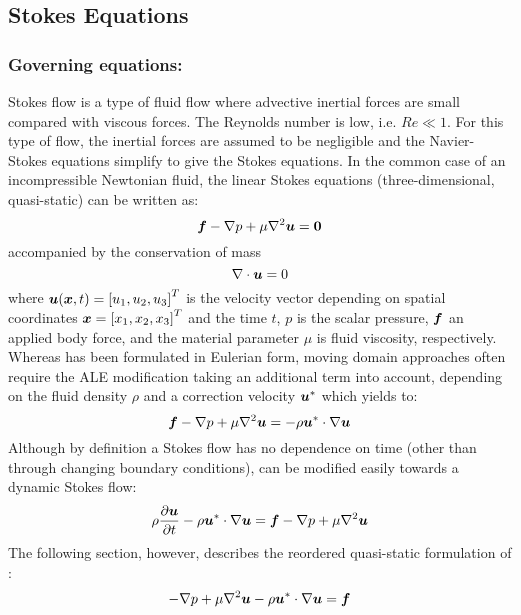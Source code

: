 \subsection{Stokes Equations}

\subsubsection{Governing equations:}

Stokes flow is a type of fluid flow where advective inertial forces are small
compared with viscous forces. The Reynolds number is low, i.e.
$\textit{Re}\ll 1$. For this type of flow, the inertial forces are assumed to
be negligible and the Navier-Stokes equations simplify to give the Stokes
equations. In the common case of an incompressible Newtonian fluid, the linear
Stokes equations (three-dimensional, quasi-static) can be written as:
\begin{equation}
    \vectr{f}-\gradient{}{p}+\mu\laplacian{}{\vectr{u}}=\vectr{0}
  \label{eqn:Stokesequation1}
\end{equation}
accompanied by the conservation of mass
\begin{equation}
  \divergence{}{\vectr{u}}=0
  \label{eqn:Stokesmasequation}
\end{equation}
where $\boldsymbol{u}(\boldsymbol{x},t)={\left[ u_1,u_2,u_3 \right]}^{T}$ is the
velocity vector depending on spatial coordinates $\boldsymbol{x}={\left[ x_1,x_2,x_3 \right]}^{T}$
and the time $t$, $p$ is the scalar pressure, $\boldsymbol{f}$ an applied body
force, and the material parameter $\mu$ is fluid viscosity,
respectively. Whereas  has been formulated in
Eulerian form, moving domain approaches often require the ALE modification
taking an additional term into account, depending on the fluid density $\rho$
and a correction velocity $\boldsymbol{u}^*$ which yields to:
\begin{equation}
  \vectr{f}-\gradient{}{p}+\mu\laplacian{}{\vectr{u}}=-\rho\dotprod{\vectr{u}^*}{\gradient{}{\vectr{u}}}
  \label{eqn:StokesequationALE}
\end{equation}
Although by definition a Stokes flow has no dependence on time (other than
through changing boundary conditions),  can be
modified easily towards a dynamic Stokes flow:
\begin{equation}
    \rho\delby{\vectr{u}}{t}-\rho\dotprod{\vectr{u}^*}{\gradient{}{\vectr{u}}}=\vectr{f}-\gradient{}{p}+\mu\laplacian{}{\vectr{u}}
  \label{eqn:Stokesequation2}
\end{equation}
The following section, however, describes the reordered quasi-static
formulation of :
\begin{equation}
    -\gradient{}{p}+\mu\laplacian{}{\vectr{u}}-\rho\dotprod{\vectr{u}^*}{\gradient{}{\vectr{u}}}=\vectr{f}
  \label{eqn:StokesequationALE2}
\end{equation}

